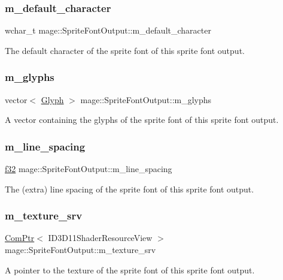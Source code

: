 \subsubsection{\texorpdfstring{m\+\_\+default\+\_\+character}{m\_default\_character}}
{\footnotesize\ttfamily wchar\+\_\+t mage\+::\+Sprite\+Font\+Output\+::m\+\_\+default\+\_\+character}

The default character of the sprite font of this sprite font output. \hypertarget{structmage_1_1_sprite_font_output_aee63c847a919bce662dee371594607dd}{}\label{structmage_1_1_sprite_font_output_aee63c847a919bce662dee371594607dd} 
\subsubsection{\texorpdfstring{m\+\_\+glyphs}{m\_glyphs}}
{\footnotesize\ttfamily vector$<$ \hyperlink{structmage_1_1_glyph}{Glyph} $>$ mage\+::\+Sprite\+Font\+Output\+::m\+\_\+glyphs}

A vector containing the glyphs of the sprite font of this sprite font output. \hypertarget{structmage_1_1_sprite_font_output_a871dbed7a4b8cd00fdda2aa30769726c}{}\label{structmage_1_1_sprite_font_output_a871dbed7a4b8cd00fdda2aa30769726c} 
\subsubsection{\texorpdfstring{m\+\_\+line\+\_\+spacing}{m\_line\_spacing}}
{\footnotesize\ttfamily \hyperlink{namespacemage_a6a44ad388483959dc4dff9f2aef91431}{f32} mage\+::\+Sprite\+Font\+Output\+::m\+\_\+line\+\_\+spacing}

The (extra) line spacing of the sprite font of this sprite font output. \hypertarget{structmage_1_1_sprite_font_output_abece35d0abdacf81538969a3ec8a5617}{}\label{structmage_1_1_sprite_font_output_abece35d0abdacf81538969a3ec8a5617} 
\subsubsection{\texorpdfstring{m\+\_\+texture\+\_\+srv}{m\_texture\_srv}}
{\footnotesize\ttfamily \hyperlink{namespacemage_ae74f374780900893caa5555d1031fd79}{Com\+Ptr}$<$ I\+D3\+D11\+Shader\+Resource\+View $>$ mage\+::\+Sprite\+Font\+Output\+::m\+\_\+texture\+\_\+srv}

A pointer to the texture of the sprite font of this sprite font output. 